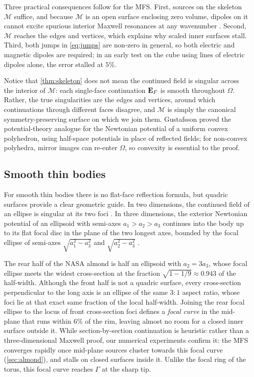 Three practical consequences follow for the MFS. First, sources on the skeleton $\mathcal{M}$ suffice, and because $\mathcal{M}$ is an open surface enclosing zero volume, dipoles on it cannot excite spurious interior Maxwell resonances at any wavenumber \cite{colton2013,kangro2012}. Second, $\mathcal{M}$ reaches the edges and vertices, which explains why scaled inner surfaces stall. Third, both jumps in \eqref{eq:jumps} are non-zero in general, so both electric and magnetic dipoles are required; in an early test on the cube using lines of electric dipoles alone, the error stalled at $5\%$.

Notice that \autoref{thm:skeleton} does not mean the continued field is singular across the interior of $\mathcal{M}$: each single-face continuation $\mathbf{E}_F$ is smooth throughout $\Omega$. Rather, the true singularities are the edges and vertices, around which continuations through different faces disagree, and $\mathcal{M}$ is simply the canonical symmetry-preserving surface on which we join them. Gustafsson \cite{gustafsson1998} proved the potential-theory analogue for the Newtonian potential of a uniform convex polyhedron, using half-space potentials in place of reflected fields; for non-convex polyhedra, mirror images can re-enter $\Omega$, so convexity is essential to the proof.

\subsection{Smooth thin bodies}
\label{sec:focal}

For smooth thin bodies there is no flat-face reflection formula, but quadric surfaces provide a clear geometric guide. In two dimensions, the continued field of an ellipse is singular at its two foci \cite{millar1971,barnett2008}. In three dimensions, the exterior Newtonian potential of an ellipsoid with semi-axes $a_1>a_2>a_3$ continues into the body up to its flat focal disc in the plane of the two longest axes, bounded by the focal ellipse of semi-axes $\sqrt{a_1^2-a_3^2}$ and $\sqrt{a_2^2-a_3^2}$ \cite{khavinson2014}.

The rear half of the NASA almond is half an ellipsoid with $a_2 = 3a_3$, whose focal ellipse meets the widest cross-section at the fraction $\sqrt{1-1/9}\approx0.943$ of the half-width. Although the front half is not a quadric surface, every cross-section perpendicular to the long axis is an ellipse of the same $3{:}1$ aspect ratio, whose foci lie at that exact same fraction of the local half-width. Joining the rear focal ellipse to the locus of front cross-section foci defines a \emph{focal curve} in the mid-plane that runs within $6\%$ of the rim, leaving almost no room for a closed inner surface outside it. While section-by-section continuation is heuristic rather than a three-dimensional Maxwell proof, our numerical experiments confirm it: the MFS converges rapidly once mid-plane sources cluster towards this focal curve (\autoref{sec:almond}), and stalls on closed surfaces inside it. Unlike the focal ring of the torus, this focal curve reaches $\Gamma$ at the sharp tip.
